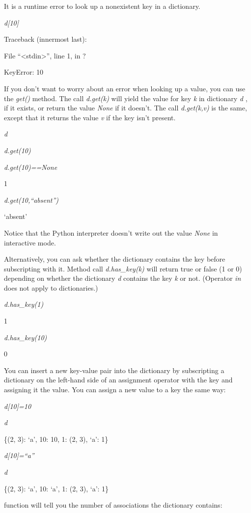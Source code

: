 It is a runtime error to look up a
nonexistent key in a dictionary.


\emph{d{[}10{]}}

Traceback (innermost last):

 File
``\textless{}stdin\textgreater{}'', line 1, in ?

KeyError: 10

If you don't want to worry about an
error when looking up a value, you can use the \emph{get()} method. The
call \emph{d.get(k)} will yield the value for key \emph{k} in dictionary
\emph{d} , if it exists, or return the value \emph{None} if it doesn't.
The call \emph{d.get(k,v)} is the same, except that it returns the value
\emph{v} if the key isn't present.


\emph{d}




\emph{d.get(10)}


\emph{d.get(10)==None}

1


\emph{d.get(10,``absent'')}

`absent'

Notice that the Python interpreter
doesn't write out the value \emph{None} in interactive mode.

Alternatively, you can ask whether
the dictionary contains the key before subscripting with it. Method call
\emph{d.has\_key(k)} will return true or false (1 or 0) depending on
whether the dictionary \emph{d} contains the key \emph{k} or not.
(Operator \emph{in} does not apply to dictionaries.)


\emph{d.has\_key(1)}

1


\emph{d.has\_key(10)}

0

You can insert a new key-value pair
into the dictionary by subscripting a dictionary on the left-hand side
of an assignment operator with the key and assigning it the value. You
can assign a new value to a key the same way:


\emph{d{[}10{]}=10}


\emph{d}

\{(2, 3): `a', 10: 10, 1: (2, 3),
`a': 1\}


\emph{d{[}10{]}=``a''}


\emph{d}

\{(2, 3): `a', 10: `a', 1: (2, 3),
`a': 1\}

 function will tell
you the number of associations the dictionary contains:


